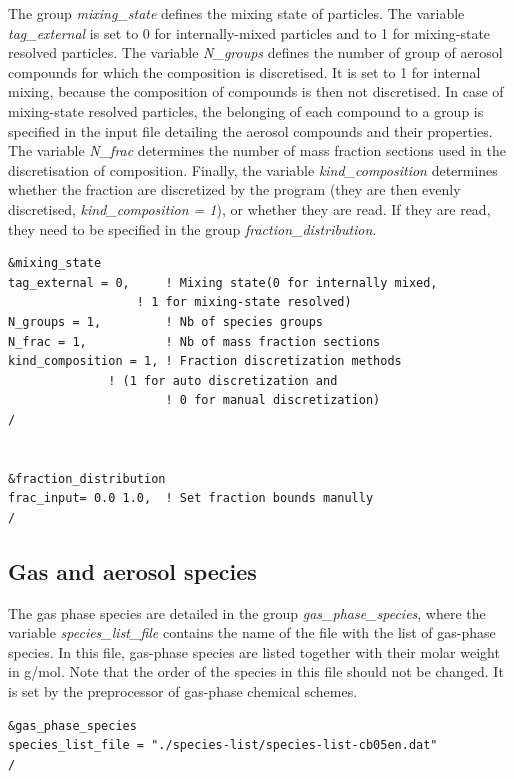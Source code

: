 \documentclass[a4paper,11pt]{article}
\begin{document}
The group {\textit{mixing\_state}} defines the mixing state of particles. The variable {\textit{tag\_external}} is set to 0 for internally-mixed particles and to 1 for mixing-state resolved particles. The variable {\textit{N\_groups}} defines the number of group of aerosol compounds for which the composition is discretised. It is set to 1 for internal mixing, because the composition of compounds is then not discretised. In case of mixing-state resolved particles, the belonging of each compound to a group is specified in the input file detailing the aerosol compounds and their properties.
The variable {\textit{N\_frac}} determines the number of mass fraction sections used in the discretisation of composition. 
Finally, the variable {\textit{kind\_composition}} determines whether the fraction are discretized by the program (they are then evenly discretised, {\textit{kind\_composition = 1}}), or whether they are read. If they are read, they need to be specified in the group {\textit{fraction\_distribution}}.


\begin{verbatim}
&mixing_state
tag_external = 0,     ! Mixing state(0 for internally mixed, 
	              ! 1 for mixing-state resolved) 
N_groups = 1,         ! Nb of species groups
N_frac = 1, 	      ! Nb of mass fraction sections
kind_composition = 1, ! Fraction discretization methods 
		      ! (1 for auto discretization and 
                      ! 0 for manual discretization)
/


&fraction_distribution
frac_input= 0.0 1.0,  ! Set fraction bounds manully
/

\end{verbatim}

\subsection{Gas and aerosol species}

The gas phase species are detailed in the group {\textit{gas\_phase\_species}}, where the variable {\textit{species\_list\_file}} contains the name of the file with the list of gas-phase species.
In this file, gas-phase species are listed together with their molar weight in g/mol. Note that the order of the species in this file should not be changed. It is set by the preprocessor of gas-phase chemical schemes.


\begin{verbatim}
&gas_phase_species
species_list_file = "./species-list/species-list-cb05en.dat"   
/
\end{verbatim}
\end{document}

